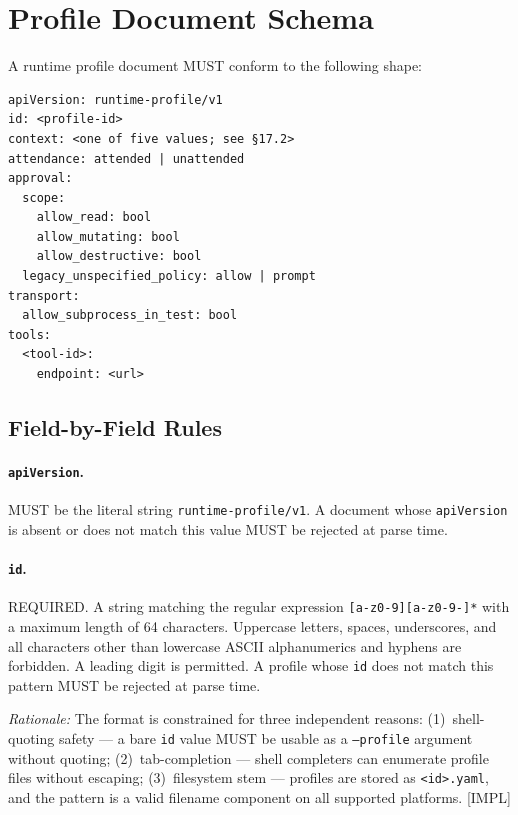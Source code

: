 \section{Profile Document Schema}
\label{sec:rp-schema}

A runtime profile document MUST conform to the following shape:

\begin{verbatim}
apiVersion: runtime-profile/v1
id: <profile-id>
context: <one of five values; see §17.2>
attendance: attended | unattended
approval:
  scope:
    allow_read: bool
    allow_mutating: bool
    allow_destructive: bool
  legacy_unspecified_policy: allow | prompt
transport:
  allow_subprocess_in_test: bool
tools:
  <tool-id>:
    endpoint: <url>
\end{verbatim}

\subsection{Field-by-Field Rules}

\paragraph{\texttt{apiVersion}.} MUST be the literal string
\texttt{runtime-profile/v1}. A document whose \texttt{apiVersion} is absent or
does not match this value MUST be rejected at parse time.

\paragraph{\texttt{id}.} REQUIRED.  A string matching the regular expression
\verb|[a-z0-9][a-z0-9-]*| with a maximum length of 64 characters.
Uppercase letters, spaces, underscores, and all characters other than
lowercase ASCII alphanumerics and hyphens are forbidden.
A leading digit is permitted.
A profile whose \texttt{id} does not match this pattern MUST be rejected
at parse time.

\textit{Rationale:} The format is constrained for three independent reasons:
(1)~shell-quoting safety — a bare \texttt{id} value MUST be usable as a
\texttt{--profile} argument without quoting; (2)~tab-completion — shell
completers can enumerate profile files without escaping; (3)~filesystem
stem — profiles are stored as \texttt{<id>.yaml}, and the pattern is a
valid filename component on all supported platforms.  [IMPL]

